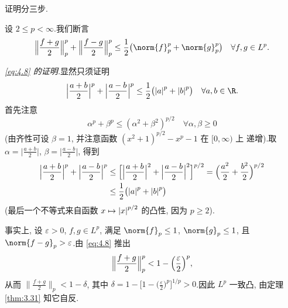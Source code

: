 证明分三步.

设 $2\le p<\infty$.我们断言
\begin{equation}
\Bigl\|\frac{f+g}2\Bigr\|_p^p+\Bigl\|\frac{f-g}2\Bigr\|_p^p
\le\frac12\bigl(\norm{f}_p^p+\norm{g}_p^p\bigr)\quad\forall f,g\in L^p.
\label{eq:4.8}
\end{equation}

\emph{\eqref{eq:4.8} 的证明.}显然只须证明
\begin{equation*}
\Bigl|\frac{a+b}2\Bigr|^p+\Bigl|\frac{a-b}2\Bigr|^p
\le\frac12\bigl(\abs{a}^p+\abs{b}^p\bigr)\quad\forall a,b\in\R.
\end{equation*}
首先注意
\begin{equation*}
\alpha^p+\beta^p\le(\alpha^2+\beta^2)^{p/2}\quad\forall\alpha,\beta\ge0
\end{equation*}
(由齐性可设 $\beta=1$, 并注意函数 $(x^2+1)^{p/2}-x^p-1$ 在 $[0,\infty)$ 上
递增).取 $\alpha=\bigl|\frac{a+b}2\bigr|$, $\beta=\bigl|\frac{a-b}2\bigr|$,
得到
\begin{equation*}
\begin{aligned}
\Bigl|\frac{a+b}2\Bigr|^p+\Bigl|\frac{a-b}2\Bigr|^p
&\le\Bigl[\Bigl|\frac{a+b}2\Bigr|^2+\Bigl|\frac{a-b}2\Bigr|^2\Bigr]^{p/2}
=\Bigl(\frac{a^2}2+\frac{b^2}2\Bigr)^{p/2}\\
&\le\frac12\bigl(\left|a\right|^p+\left|b\right|^p\bigr)
\end{aligned}
\end{equation*}
(最后一个不等式来自函数 $x\mapsto\left|x\right|^{p/2}$ 的凸性, 因为 $p\ge2$).

事实上, 设 $\varepsilon>0$, $f,g\in L^p$, 满足 $\norm{f}_p\le1$, $\norm{g}_p\le1$, 且 $\norm{f-g}_p>\varepsilon$.由 \eqref{eq:4.8} 推出
\begin{equation*}
\Bigl\|\frac{f+g}2\Bigr\|_p^p<1-\Bigl(\frac\varepsilon2\Bigr)^p,
\end{equation*}
从而 $\bigl\|\frac{f+g}2\bigr\|_p<1-\delta$, 其中
$\delta=1-\bigl[1-\bigl(\frac\varepsilon2\bigr)^p\bigr]^{1/p}>0$.因此 $L^p$ 一致凸,
由定理  \ref{thm:3.31} 知它自反.


